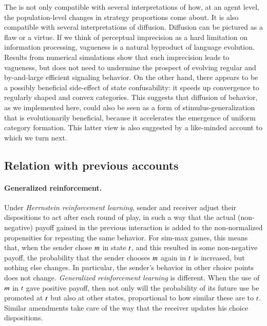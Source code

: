 \documentclass[fleqn,reqno,10pt]{article}
\newcommand{\rdd}{\acro{rdd}} %
\begin{document}
The \rdd is not only compatible with several interpretations of how,
at an agent level, the population-level changes in strategy
proportions come about. It is also compatible with several
interpretations of diffusion. Diffusion can be pictured as a flaw or a
virtue. If we think of perceptual imprecision as a hard limitation on
information processing, vagueness is a natural byproduct of language
evolution. Results from numerical simulations show that such
imprecision leads to vagueness, but does not need to undermine the
prospect of evolving regular and by-and-large efficient signaling
behavior. On the other hand, there appears to be a possibly beneficial
side-effect of state confusability: it speeds up convergence to
regularly shaped and convex categories. This suggests that diffusion
of behavior, as we implemented here, could also be seen as a form
of stimulus-generalization that is evolutionarily beneficial, because
it accelerates the emergence of uniform category formation. This
latter view is also suggested by a like-minded account to which we
turn next.

\subsection{Relation with previous accounts}
\label{sec:relat-with-prev}

\paragraph{Generalized reinforcement.}

Under \emph{Herrnstein reinforcement learning}, sender and receiver
adjust their dispositions to act after each round of play, in such a
way that the actual (non-negative) payoff gained in the previous
interaction is added to the non-normalized propensities for repeating
the same behavior. For sim-max games, this means that, when the sender
chose $m$ in state $t$, and this resulted in some
non-negative payoff, the probability that the sender chooses $m$
again in $t$ is increased, but nothing else changes. In
particular, the sender's behavior in other choice points does not
change. \emph{Generalized reinforcement learning} is different. When
the use of $m$ in $t$ gave positive payoff, then not only
will the probability of its future use be promoted at $t$ but also at
other states, proportional to how similar these are to
$t$. Similar amendments take care of the way that the receiver
updates his choice dispositions.
\end{document}
